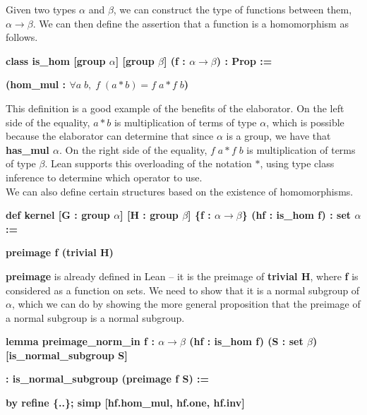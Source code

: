 \documentclass[runningheads,a4paper]{llncs}
\renewcommand{\a}{\alpha}
\renewcommand{\b}{\beta}
\renewcommand{\-}{\setminus}
\begin{document}
Given two types $\a$ and $\b$, we can construct the type of functions between them, $\a \to \b$. We can then define the assertion that a function is a homomorphism as follows.

\vspace{2 mm}
\hspace{2 em}\textbf{class is\_hom [group $\a$] [group $\b$] (f : $\a \to \b$) : Prop :=}

\hspace{4 em}\textbf{(hom\_mul : $\forall a\; b,\; f\; (a * b) = f\; a * f\; b$)}
\vspace{2 mm}

This definition is a good example of the benefits of the elaborator. On the left side of the equality, $a * b$ is multiplication of terms of type $\a$, which is possible because the elaborator can determine that since $\a$ is a group, we have that \textbf{has\_mul $\a$}. On the right side of the equality, $f\; a * f\; b$ is multiplication of terms of type $\b$. Lean supports this overloading of the notation $*$, using type class inference to determine which operator to use.\\

We can also define certain structures based on the existence of homomorphisms.

\vspace{2 mm}
\hspace{2 em}\textbf{def kernel [G : group $\a$] [H : group $\b$] \{f : $\a \to \b$\} (hf : is\_hom f) : set $\a$ :=}

\hspace{4 em}\textbf{preimage f (trivial H)}
\vspace{2 mm}

\textbf{preimage} is already defined in Lean -- it is the preimage of \textbf{trivial H}, where \textbf{f} is considered as a function on sets. We need to show that it is a normal subgroup of $\a$, which we can do by showing the more general proposition that the preimage of a normal subgroup is a normal subgroup.

\vspace{2 mm}
\hspace{0 em}\textbf{lemma preimage\_norm\_in {f : $\a \to \b$} (hf : is\_hom f) (S : set $\b$) [is\_normal\_subgroup S]}

\hspace{2 em}\textbf{: is\_normal\_subgroup (preimage f S) :=}

\hspace{4 em}\textbf{by refine \{..\}; simp [hf.hom\_mul, hf.one, hf.inv]}
\vspace{2 mm}
\end{document}
